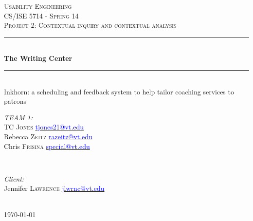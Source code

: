 \documentclass[12pt]{article} %
\begin{document}

\begin{titlepage}

\newcommand{\HRule}{\rule{\linewidth}{0.5mm}} %

\center %

\textsc{\LARGE Usability Engineering}\\[1.5cm] %
\textsc{\Large CS/ISE 5714 - Spring 14}\\[0.5cm] %
\textsc{\large  Project 2: Contextual inquiry and contextual analysis}\\[0.5cm] %

\HRule \\[0.4cm]
{ \huge \bfseries The Writing Center }\\[0.4cm] %
\HRule \\[0.4cm]
{ \small Inkhorn: a scheduling and feedback system to help tailor coaching services to patrons }\\[0.4cm] %
\vspace{1.5cm}


\begin{minipage}{0.4\textwidth}
\begin{flushleft} \large
\emph{TEAM 1:}\\
TC \textsc{Jones} \href{mailto:tjones21@vt.edu}{\textcolor{blue}{tjones21@vt.edu}}\\
Rebecca \textsc{Zeitz} \href{mailto:razeitz@cs.vt.edu}{\textcolor{blue}{razeitz@vt.edu}}\\
Chris \textsc{Frisina}  \href{mailto:special@vt.edu}{\textcolor{blue}{special@vt.edu}}\\
\end{flushleft}
\end{minipage}
~
\begin{minipage}{0.4\textwidth}
\begin{flushright} \large
\emph{Client:} \\
Jennifer \textsc{Lawrence}  \href{mailto:jlwrnc@vt.edu}{\textcolor{blue}{jlwrnc@vt.edu}}\\
\end{flushright}
\end{minipage}\\[4cm]

{\large \today}\\[3cm] %


\vfill %

\end{titlepage}
\end{document}
